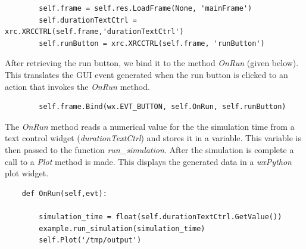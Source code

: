\documentclass[12pt]{article}
\begin{document}
{\footnotesize
   \linenumbers
 \begin{verbatim}
        self.frame = self.res.LoadFrame(None, 'mainFrame')
        self.durationTextCtrl = xrc.XRCCTRL(self.frame,'durationTextCtrl')
        self.runButton = xrc.XRCCTRL(self.frame, 'runButton') \end{verbatim}
}

After retrieving the run button, we bind it to the method {\it OnRun}
(given below).  This translates the GUI event generated when
the run button is clicked to an action that invokes the {\it OnRun}
method.

{\footnotesize
   \linenumbers
 \begin{verbatim}
        self.frame.Bind(wx.EVT_BUTTON, self.OnRun, self.runButton) \end{verbatim} 
}



% 


The {\it OnRun} method reads a numerical value for the the simulation
time from a text control widget ({\it durationTextCtrl}) and stores it
in a variable.  This variable is then passed to the function {\it
  run\_simulation}.  After the simulation is complete a call to a {\it
  Plot} method is made. This displays the generated data in a {\it
  wxPython} plot widget.

{\footnotesize
  \linenumbers
\begin{verbatim}
    def OnRun(self,evt):

        simulation_time = float(self.durationTextCtrl.GetValue())
        example.run_simulation(simulation_time)
        self.Plot('/tmp/output')
\end{verbatim}
}
 
\end{document}
